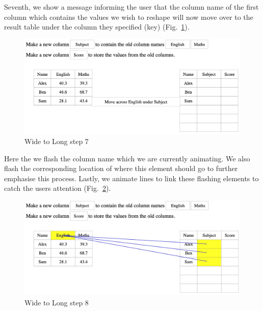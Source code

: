 \newpage
Seventh, we show a message informing the user that the column name of the first column which contains the values we wish to reshape will now move over to the result table under the column they specified (key) (Fig.~\ref{fig:gather7}).
\begin{figure}[H]
    \includegraphics[scale = 0.35]{Masters-Thesis/img/gather7.png}
    \caption{Wide to Long step 7}
    \label{fig:gather7}
\end{figure}

Here the we flash the column name which we are currently animating. We also flash the corresponding location of where this element should go to further emphasise this process. Lastly, we animate lines to link these flashing elements to catch the users attention (Fig.~\ref{fig:gather8}). 
\begin{figure}[H]
    \includegraphics[scale = 0.35]{Masters-Thesis/img/gather8.png}
    \caption{Wide to Long step 8}
    \label{fig:gather8}
\end{figure}

